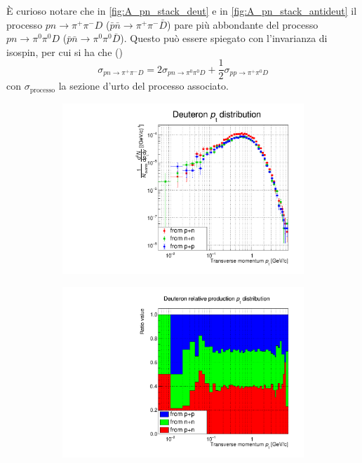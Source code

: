 È curioso notare che in \autoref{fig:A_pn_stack_deut} e in \autoref{fig:A_pn_stack_antideut} il processo $pn\to \pi^+\pi^- D$ ($ \bar p \bar n\to \pi^+\pi^- \bar D$) pare più abbondante del processo $pn\to \pi^0\pi^0D$ ($ \bar p \bar n\to \pi^0\pi^0 \bar D$).
Questo può essere spiegato con l'invarianza di isospin, per cui si ha che (\cite{Dal_2015})
\begin{equation}
    \sigma_{pn\to\pi^+\pi^-D} = 2\sigma_{pn\to\pi^0\pi^0D} + \dfrac12\sigma_{pp\to\pi^+\pi^0D}
\end{equation}
con $\sigma_\text{processo}$ la sezione d'urto del processo associato.
\begin{figure}[htbp]
    \centering
    \begin{subfigure}{.49\textwidth}
    \centering
        \includegraphics[width=\textwidth]{image/3-risultati/deuteron_analyse/A/ov_log.pdf}
        \caption{}
        \label{fig:A_ov_deut}
    \end{subfigure}
    \begin{subfigure}{.49\textwidth}
        \centering
        \includegraphics[width=\textwidth]{image/3-risultati/deuteron_analyse/A/ov_stack.pdf}

\end{subfigure}
\end{figure}
